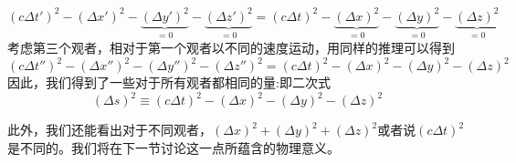 \begin{equation}\label{eq2.11}
\left( c \Delta t' \right)^2
-\left(\Delta x' \right)^2
-\underbrace{\left(\Delta y' \right)^2}_{=0}
-\underbrace{\left(\Delta z' \right)^2}_{=0}
=
\left( c \Delta t \right)^2
-\underbrace{\left(\Delta x \right)^2}_{=0}
-\underbrace{\left(\Delta y \right)^2}_{=0}
-\underbrace{\left(\Delta z \right)^2}_{=0}
\end{equation}
考虑第三个观者，相对于第一个观者以不同的速度运动，用同样的推理可以得到
\begin{equation}\label{eq2.12}
\left( c \Delta t'' \right)^2
-\left(\Delta x'' \right)^2
-\left(\Delta y'' \right)^2
-\left(\Delta z'' \right)^2
=
\left( c \Delta t \right)^2
-\left(\Delta x \right)^2
-\left(\Delta y \right)^2
-\left(\Delta z \right)^2
\end{equation}
因此，我们得到了一些对于所有观者都相同的量:即二次式
\begin{equation}\label{eq2.13}
(\Delta s)^2
\equiv\left( c \Delta t \right)^2
-\left(\Delta x \right)^2
-\left(\Delta y \right)^2
-\left(\Delta z \right)^2
\end{equation}

此外，我们还能看出对于不同观者，$(\Delta x)^2+(\Delta y)^2+(\Delta z)^2$或者说$(c\Delta t)^2$是不同的。我们将在下一节讨论这一点所蕴含的物理意义。
